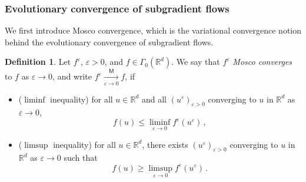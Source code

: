 \documentclass[11pt,english,reqno]{article}
\newcommand{\R}{\mathbb{R}}
\renewcommand{\leq}{\leqslant}
\renewcommand{\geq}{\geqslant}
\theoremstyle{plain}
\theoremstyle{definition}
\newtheorem{definition}[proposition]{Definition}
\theoremstyle{remark}
\numberwithin{equation}{section}
\begin{document}
\subsubsection{Evolutionary convergence of subgradient flows}
\label{subsec:evolutionary}

We first introduce Mosco convergence, which is the variational convergence notion behind the evolutionary convergence of subgradient flows.



\begin{definition}
	\label{def:mosco}
		Let $f^{\varepsilon}$, $\varepsilon > 0$, and $f \in \Gamma_0(\R^d)$. We say that $f^{\varepsilon}$ \emph{Mosco converges} to $f$ as $\varepsilon \to 0$, and write $ \displaystyle f^{\varepsilon} \xrightarrow[\varepsilon \to 0]{\mathsf{M}} f $, if
	\begin{itemize}
		\item ($\liminf$ inequality) for all $u \in \R^d$ and all $(u^{\varepsilon})_{\varepsilon > 0}$ converging to $u$ in $\R^d$ as $\varepsilon \to 0$,
		\begin{equation*}
			f(u) \leq \liminf_{\varepsilon \to 0} f^{\varepsilon}(u^{\varepsilon}) \, ,
		\end{equation*}
		\item ($\limsup$ inequality) for all $u \in \R^d$, there exists $(u^{\varepsilon})_{\varepsilon > 0}$ converging to $u$ in $\R^d$ as $\varepsilon \to 0$ such that
		\begin{equation*}
			f(u) \geq \limsup_{\varepsilon \to 0} f^{\varepsilon}(u^{\varepsilon}) \, .
		\end{equation*}
	\end{itemize}
\end{definition}
\end{document}
